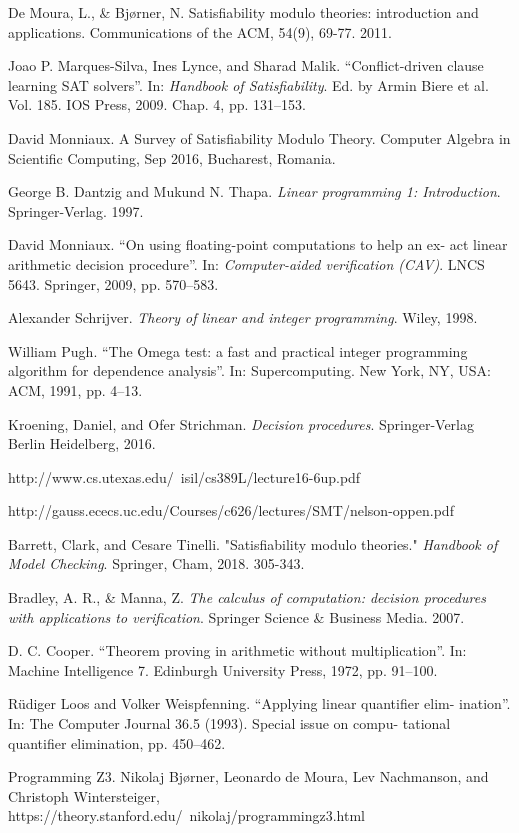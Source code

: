 \documentclass[10pt,a4paper]{article}
\begin{document}
	\begin{thebibliography}{9}
		
		De Moura, L., \& Bjørner, N. Satisfiability modulo theories: introduction and applications. Communications of the ACM, 54(9), 69-77. 2011.
		
		Joao P. Marques-Silva, Ines Lynce, and Sharad Malik. “Conflict-driven
		clause learning SAT solvers”. In: \textit{Handbook of Satisfiability}. Ed. by Armin
		Biere et al. Vol. 185. IOS Press, 2009. Chap. 4, pp. 131–153.
		
		David Monniaux. A Survey of Satisfiability Modulo Theory. Computer Algebra in Scientific Computing, Sep 2016, Bucharest, Romania.
		
		George B. Dantzig and Mukund N. Thapa. \textit{Linear programming 1: Introduction}. Springer-Verlag. 1997.
		
		David Monniaux. “On using floating-point computations to help an ex-
		act linear arithmetic decision procedure”. In: \textit{Computer-aided verification
		(CAV)}. LNCS 5643. Springer, 2009, pp. 570–583.
		
		Alexander Schrijver. \textit{Theory of linear and integer programming}. Wiley,
		1998.
		
		William Pugh. “The Omega test: a fast and practical integer programming
		algorithm for dependence analysis”. In: Supercomputing. New York, NY,
		USA: ACM, 1991, pp. 4–13.
		
		Kroening, Daniel, and Ofer Strichman. \textit{Decision procedures}. Springer-Verlag Berlin Heidelberg, 2016.
		
		http://www.cs.utexas.edu/~isil/cs389L/lecture16-6up.pdf
		
		http://gauss.ececs.uc.edu/Courses/c626/lectures/SMT/nelson-oppen.pdf
		
		Barrett, Clark, and Cesare Tinelli. "Satisfiability modulo theories." \textit{Handbook of Model Checking}. Springer, Cham, 2018. 305-343.
		
		Bradley, A. R., \& Manna, Z. \textit{The calculus of computation: decision procedures with applications to verification}. Springer Science \& Business Media. 2007.
		
		D. C. Cooper. “Theorem proving in arithmetic without multiplication”.
		In: Machine Intelligence 7. Edinburgh University Press, 1972, pp. 91–100.
		
		Rüdiger Loos and Volker Weispfenning. “Applying linear quantifier elim-
		ination”. In: The Computer Journal 36.5 (1993). Special issue on compu-
		tational quantifier elimination, pp. 450–462.
		
		Programming Z3. Nikolaj Bjørner, Leonardo de Moura, Lev Nachmanson, and Christoph Wintersteiger, https://theory.stanford.edu/~nikolaj/programmingz3.html
	\end{thebibliography}
\end{document}
